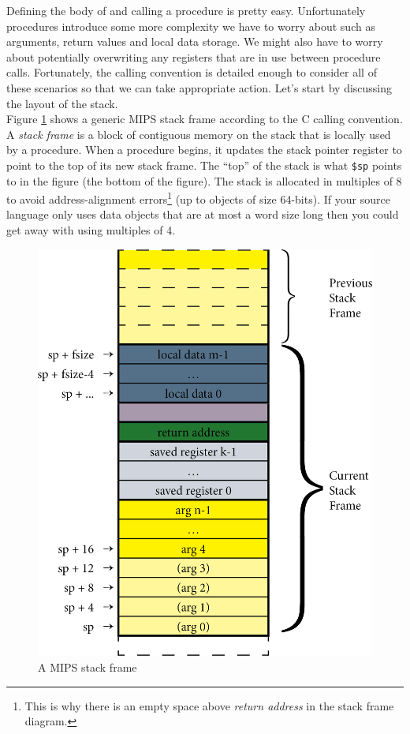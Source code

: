 \documentclass[12pt]{article}
\begin{document}
Defining the body of and calling a procedure is pretty easy. Unfortunately
     procedures introduce some more complexity we have to worry about such as
     arguments, return values and local data storage. We might also have to
     worry about potentially overwriting any registers that are in use between
     procedure calls. Fortunately, the calling convention is detailed enough to
     consider all of these scenarios so that we can take appropriate
     action. Let's start by discussing the layout of the stack.\\

Figure \ref{fig:stackframe} shows a generic MIPS stack frame according to the C
     calling convention. A \textit{stack frame} is a block of contiguous memory
     on the stack that is locally used by a procedure. When a procedure begins,
     it updates the stack pointer register to point to the top of its new stack
     frame. The ``top'' of the stack is what \texttt{\$sp} points to in the
     figure (the bottom of the figure). The stack is allocated in multiples of 8
     to avoid address-alignment errors\footnote{This is why there is an empty
     space above \textit{return address} in the stack frame diagram.} (up to
     objects of size 64-bits). If your source language only uses data objects
     that are at most a word size long then you could get away with using
     multiples of 4.\\

\newpage
\begin{figure}
\centering
\includegraphics{stack-frame.png}
\caption{A MIPS stack frame}
\label{fig:stackframe}
\end{figure}
\end{document}
